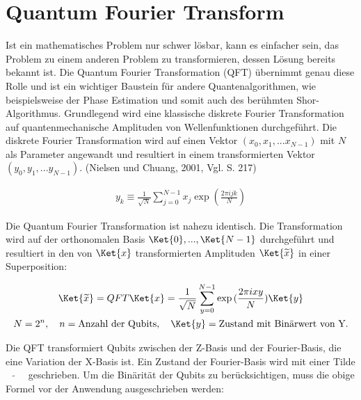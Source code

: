 \section{Quantum Fourier Transform}\newline


Ist ein mathematisches Problem nur schwer lösbar, kann es einfacher sein, das Problem zu einem anderen Problem zu transformieren, dessen Lösung bereits bekannt ist. Die Quantum Fourier Transformation (QFT) übernimmt genau diese Rolle und ist ein wichtiger Baustein für andere Quantenalgorithmen, wie beispielsweise der Phase Estimation und somit auch des berühmten Shor-Algorithmus. \newline  Grundlegend wird eine klassische diskrete Fourier Transformation auf quantenmechanische Amplituden von Wellenfunktionen durchgeführt. Die diskrete Fourier Transformation wird auf einen Vektor \((x_0, x_1, ...x_{N-1})\) mit \(N\) als Parameter angewandt und resultiert in einem transformierten Vektor \((y_0, y_1, ...y_{N-1})\). (Nielsen und Chuang, 2001, Vgl. S. 217)



\begin{equation}\begin{gathered}
        y_k \equiv \frac{1}{\sqrt{N}} \sum_{j=0}^{N-1} x_j\exp{(\frac{2\pi ijk}{N})}
    \end{gathered}\end{equation}

Die Quantum Fourier Transformation ist nahezu identisch. Die Transformation wird auf der orthonomalen Basis
\(\Ket{0}, ..., \Ket{N-1}\) durchgeführt und resultiert in den von \(\Ket{x}\) transformierten
Amplituden \(\Ket{\widetilde{x}}\) in einer Superposition:

\begin{equation}\begin{gathered}
        \Ket{\widetilde{x}} =  QFT \Ket{x} = \frac{1}{\sqrt{N}} \sum_{y=0}^{N-1} \exp{(\frac{2\pi ixy}{N})}\Ket{y} \\
        N = 2^n, \quad n = \text{Anzahl der Qubits}, \quad \Ket{y} = \text{Zustand mit Binärwert von Y.}
    \end{gathered}\end{equation}

Die QFT transformiert Qubits zwischen der Z-Basis und der Fourier-Basis,
die eine Variation der X-Basis ist. Ein Zustand der Fourier-Basis wird mit einer Tilde \(\quad \widetilde{} \quad\) geschrieben.
\newline
Um die Binärität der Qubits zu berücksichtigen, muss die obige Formel vor der Anwendung ausgeschrieben werden:

